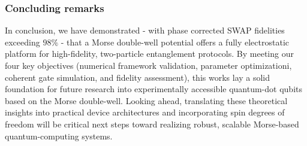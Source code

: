 \documentclass{subfiles}
\begin{document}
\subsubsection*{Concluding remarks}
In conclusion, we have demonstrated - with phase corrected SWAP fidelities exceeding $98\%$ - that a Morse double-well potential offers a fully electrostatic platform for high-fidelity, two-particle entanglement protocols. By meeting our four key objectives (numerical framework validation, parameter optimizationi, coherent gate simulation, and fidelity assessment), this works lay a solid foundation for future research into experimentally accessible quantum-dot qubits based on the Morse double-well. Looking ahead, translating these theoretical insights into practical device architectures and incorporating spin degrees of freedom will be critical next steps toward realizing robust, scalable Morse-based quantum-computing systems.
\end{document}
